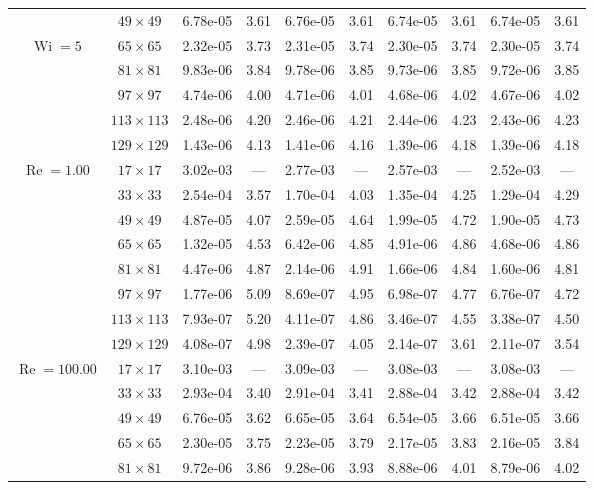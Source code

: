 \documentclass[preprint, 12pt]{elsarticle}
\begin{document}
{\begin{center}
\begin{table}[H]
{\begin{tabular*}{\textwidth}{@{\extracolsep\fill}cccccccccc@{}}
& $49\times 49$ & 6.78e-05 & 3.61 & 6.76e-05 & 3.61 & 6.74e-05 & 3.61 & 6.74e-05 & 3.61 \\
\multirow{3}{*}{$\operatorname{Wi}=5$} & $65\times 65$ & 2.32e-05 & 3.73 & 2.31e-05 & 3.74 & 2.30e-05 & 3.74 & 2.30e-05 & 3.74 \\
& $81\times 81$ & 9.83e-06 & 3.84 & 9.78e-06 & 3.85 & 9.73e-06 & 3.85 & 9.72e-06 & 3.85 \\
& $97\times 97$ & 4.74e-06 & 4.00 & 4.71e-06 & 4.01 & 4.68e-06 & 4.02 & 4.67e-06 & 4.02 \\
& $113\times 113$ & 2.48e-06 & 4.20 & 2.46e-06 & 4.21 & 2.44e-06 & 4.23 & 2.43e-06 & 4.23 \\
& $129\times 129$ & 1.43e-06 & 4.13 & 1.41e-06 & 4.16 & 1.39e-06 & 4.18 & 1.39e-06 & 4.18 \\
    \hline\hline
    \multirow{7}{*}{$\operatorname{Re}=1.00$} & $17\times 17$ & 3.02e-03 & --- & 2.77e-03 & --- & 2.57e-03 & --- & 2.52e-03 & --- \\
& $33\times 33$ & 2.54e-04 & 3.57 & 1.70e-04 & 4.03 & 1.35e-04 & 4.25 & 1.29e-04 & 4.29 \\
& $49\times 49$ & 4.87e-05 & 4.07 & 2.59e-05 & 4.64 & 1.99e-05 & 4.72 & 1.90e-05 & 4.73 \\
\multirow{3}{*}{$\operatorname{Wi}=10$} & $65\times 65$ & 1.32e-05 & 4.53 & 6.42e-06 & 4.85 & 4.91e-06 & 4.86 & 4.68e-06 & 4.86 \\
& $81\times 81$ & 4.47e-06 & 4.87 & 2.14e-06 & 4.91 & 1.66e-06 & 4.84 & 1.60e-06 & 4.81 \\
& $97\times 97$ & 1.77e-06 & 5.09 & 8.69e-07 & 4.95 & 6.98e-07 & 4.77 & 6.76e-07 & 4.72 \\
& $113\times 113$ & 7.93e-07 & 5.20 & 4.11e-07 & 4.86 & 3.46e-07 & 4.55 & 3.38e-07 & 4.50 \\
& $129\times 129$ & 4.08e-07 & 4.98 & 2.39e-07 & 4.05 & 2.14e-07 & 3.61 & 2.11e-07 & 3.54 \\
    \hline
    \multirow{7}{*}{$\operatorname{Re}=100.00$} & $17\times 17$ & 3.10e-03 & --- & 3.09e-03 & --- & 3.08e-03 & --- & 3.08e-03 & --- \\
& $33\times 33$ & 2.93e-04 & 3.40 & 2.91e-04 & 3.41 & 2.88e-04 & 3.42 & 2.88e-04 & 3.42 \\
& $49\times 49$ & 6.76e-05 & 3.62 & 6.65e-05 & 3.64 & 6.54e-05 & 3.66 & 6.51e-05 & 3.66 \\
\multirow{3}{*}{$\operatorname{Wi}=10$} & $65\times 65$ & 2.30e-05 & 3.75 & 2.23e-05 & 3.79 & 2.17e-05 & 3.83 & 2.16e-05 & 3.84 \\
& $81\times 81$ & 9.72e-06 & 3.86 & 9.28e-06 & 3.93 & 8.88e-06 & 4.01 & 8.79e-06 & 4.02 \\

\end{tabular*}}
\end{table}
\end{center}}
\end{document}
